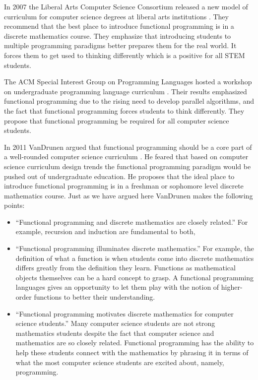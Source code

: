 In 2007 the Liberal Arts Computer Science Consortium released a new
model of curriculum for computer science degrees at liberal arts
institutions \cite{LiberalArtsComputerScienceConsortium:2007}.  They
recommend that the best place to introduce functional programming is
in a discrete mathematics course.  They emphasize that introducing
students to multiple programming paradigms better prepares them for
the real world. It forces them to get used to thinking differently
which is a positive for all STEM students.

The ACM Special Interest Group on Programming Languages hosted a
workshop on undergraduate programming language curriculum
\cite{Allen:2008}.  Their results emphasized functional programming
due to the rising need to develop parallel algorithms, and the fact
that functional programming forces students to think differently.
They propose that functional programming be required for all computer
science students.

In 2011 VanDrunen argued that functional programming should be a core
part of a well-rounded computer science curriculum
\cite{VanDrunen:2011}.  He feared that based on computer science
curriculum design trends the functional programming paradigm would be
pushed out of undergraduate education. He proposes that the ideal
place to introduce functional programming is in a freshman or
sophomore level discrete mathematics course.  Just as we have argued
here VanDrunen makes the following points:
\begin{itemize}
\item ``Functional programming and discrete mathematics are closely
  related.''  For example, recursion and induction are fundamental to
  both,
\item ``Functional programming illuminates discrete mathematics.'' For
  example, the definition of what a function is when students come
  into discrete mathematics differs greatly from the definition they
  learn.  Functions as mathematical objects themselves can be a hard
  concept to grasp.  A functional programming languages gives an
  opportunity to let them play with the notion of higher-order
  functions to better their understanding.
\item ``Functional programming motivates discrete mathematics for
  computer science students.'' Many computer science students are not
  strong mathematics students despite the fact that computer science
  and mathematics are so closely related.  Functional programming has
  the ability to help these students connect with the mathematics by
  phrasing it in terms of what the most computer science students are
  excited about, namely, programming.
\end{itemize}
